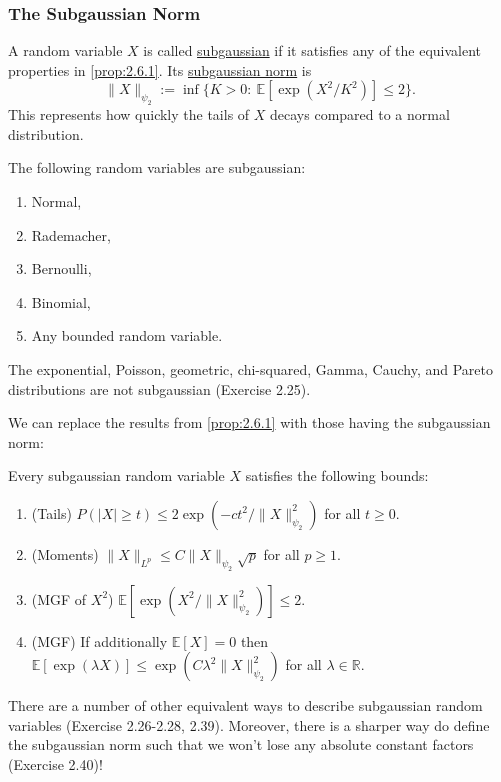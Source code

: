 \subsubsection{The Subgaussian Norm}
\begin{definition}[]
\label{def:2.6.4}
A random variable $X$ is called \underline{subgaussian} if it satisfies any of the equivalent properties 
in \cref{prop:2.6.1}. Its \underline{subgaussian norm} is 
\[ \|X\|_{\psi_2} := \inf\{ K > 0: \ \mathbb{E}[\exp{(X^2 / K^2)}] \leq 2 \}. \]
This represents how quickly the tails of $X$ decays compared to a normal distribution.
\end{definition}

\begin{example}[]
\label{ex:2.6.5}
The following random variables are subgaussian: 
\begin{enumerate}
	\item Normal,
	\item Rademacher,
	\item Bernoulli, 
	\item Binomial,
	\item Any bounded random variable.
\end{enumerate}
The exponential, Poisson, geometric, chi-squared, Gamma, Cauchy, and Pareto distributions are not 
subgaussian (Exercise 2.25).
\end{example}

We can replace the results from \ref{prop:2.6.1} with those having the subgaussian norm:
\begin{proposition}
\label{prop:2.6.6}
Every subgaussian random variable $X$ satisfies the following bounds:
\begin{enumerate}
	\item (Tails) $P(|X| \geq t) \leq 2\exp{(-ct^2 / \lVert X \rVert_{\psi_2}^2)}$ for all $t \geq 0$.
	\item (Moments) $\lVert X \rVert_{L^p} \leq C\lVert X \rVert_{\psi_2} \sqrt{p}$ for all $p \geq 1$.
	\item (MGF of $X^2$) $\mathbb{E}[\exp{(X^2 / \lVert X \rVert_{\psi_2}^2)}] \leq 2$.
	\item (MGF) If additionally $\mathbb{E}[X] = 0$ then 
	$\mathbb{E}[\exp{(\lambda X)}] \leq \exp{(C \lambda^2 
	\lVert X \rVert_{\psi_2}^2)}$ for all $\lambda \in \mathbb{R}$.
\end{enumerate}
\end{proposition}

There are a number of other equivalent ways to describe subgaussian random variables (Exercise 2.26-2.28, 
2.39). Moreover, there is a sharper way do define the subgaussian norm such that we won't lose any absolute 
constant factors (Exercise 2.40)!


